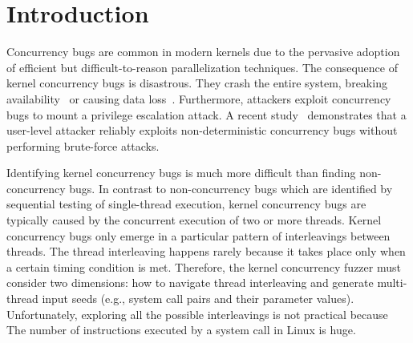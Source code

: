 \section{Introduction}
\label{s:intro}


Concurrency bugs are common in modern kernels due to 
the pervasive adoption of efficient but difficult-to-reason
parallelization techniques.
The consequence of kernel concurrency bugs is disastrous. They crash
the entire system, breaking availability~\cite{cve201812232, snowboardbug} or causing data loss~\cite{dataloss}.
Furthermore, attackers 
exploit concurrency bugs to mount a privilege escalation attack.
A recent study~\cite{exprace} demonstrates that a user-level attacker 
reliably exploits non-deterministic concurrency bugs without performing
brute-force attacks.

Identifying kernel concurrency bugs is much more difficult than 
finding non-concurrency bugs. 
In contrast to non-concurrency bugs which are identified by 
sequential testing of single-thread execution,
kernel concurrency bugs are typically caused by the concurrent execution 
of two or more threads. 
Kernel concurrency bugs only emerge in a particular pattern of 
interleavings between threads. The thread interleaving happens 
rarely because it takes place only when a certain timing condition is met.
Therefore, the kernel concurrency fuzzer must consider two dimensions: 
how to navigate thread interleaving and generate multi-thread input seeds (e.g., system call pairs and their parameter values).
Unfortunately, exploring all the possible interleavings is not practical because 
The number of instructions executed by a system call in Linux is huge.

